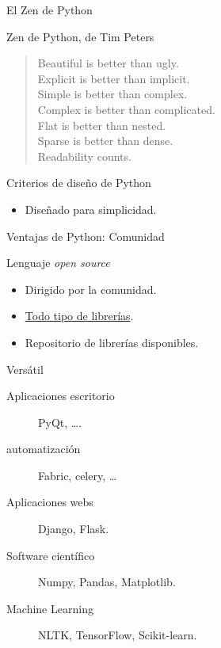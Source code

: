 \documentclass[bigger,unknownkeysallowed]{beamer}
\begin{document}
\begin{frame}[label={sec:org15e02b8}]{El Zen de Python}
\begin{block}{Zen de Python, de Tim Peters}
\begin{verse}
Beautiful is better than ugly.\\
Explicit is better than implicit.\\
Simple is better than complex.\\
Complex is better than complicated.\\
Flat is better than nested.\\
Sparse is better than dense.\\
Readability counts.\\
\end{verse}
\end{block}

\begin{block}{Criterios de diseño de Python}
\begin{itemize}
\item Diseñado para simplicidad.
\end{itemize}
\end{block}
\end{frame}

\begin{frame}[label={sec:orgd4f30ec}]{Ventajas de Python: Comunidad}
\begin{block}{Lenguaje \emph{open source}}
\begin{itemize}
\item Dirigido por la comunidad.
\item \href{https://github.com/vinta/awesome-python}{Todo tipo de librerías}.
\item Repositorio de librerías disponibles.
\end{itemize}
\end{block}

\begin{block}{Versátil}
\begin{description}
\item[{Aplicaciones escritorio}] PyQt, \ldots{}.
\item[{automatización}] Fabric, celery, \ldots{}
\item[{Aplicaciones webs}] Django, Flask.
\item[{Software científico}] Numpy, Pandas, Matplotlib.
\item[{Machine Learning}] NLTK, TensorFlow, Scikit-learn.
\end{description}
\end{block}
\end{frame}
\end{document}
